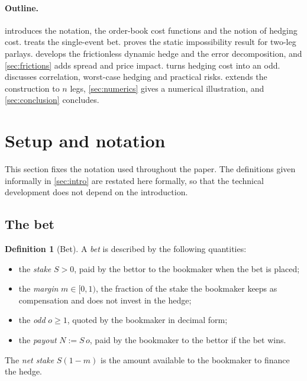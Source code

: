 \documentclass[11pt,a4paper]{article}
\theoremstyle{plain}
\theoremstyle{definition}
\newtheorem{definition}[theorem]{Definition}
\theoremstyle{remark}
\newcommand{\1}{\mathbf{1}}
\begin{document}
\paragraph{Outline.}
 introduces the notation, the order-book cost functions and the notion of hedging cost.  treats the single-event bet.  proves the static impossibility result for two-leg parlays.  develops the frictionless dynamic hedge and the error decomposition, and \cref{sec:frictions} adds spread and price impact.  turns hedging cost into an odd.  discusses correlation, worst-case hedging and practical risks.  extends the construction to $n$ legs, \cref{sec:numerics} gives a numerical illustration, and \cref{sec:conclusion} concludes.

\section{Setup and notation}
\label{sec:setup}
This section fixes the notation used throughout the paper. The definitions given informally in \cref{sec:intro} are restated here formally, so that the technical development does not depend on the introduction.

\subsection{The bet}

\begin{definition}[Bet]
\label{def:bet}
A \emph{bet} is described by the following quantities:
\begin{itemize}
  \item the \emph{stake} $S>0$, paid by the bettor to the bookmaker when the bet is placed;
  \item the \emph{margin} $m\in[0,1)$, the fraction of the stake the bookmaker keeps as compensation and does not invest in the hedge;
  \item the \emph{odd} $o\geq 1$, quoted by the bookmaker in decimal form;
  \item the \emph{payout} $N := S\,o$, paid by the bookmaker to the bettor if the bet wins.
\end{itemize}
The \emph{net stake} $S(1-m)$ is the amount available to the bookmaker to finance the hedge.
\end{definition}
\end{document}

